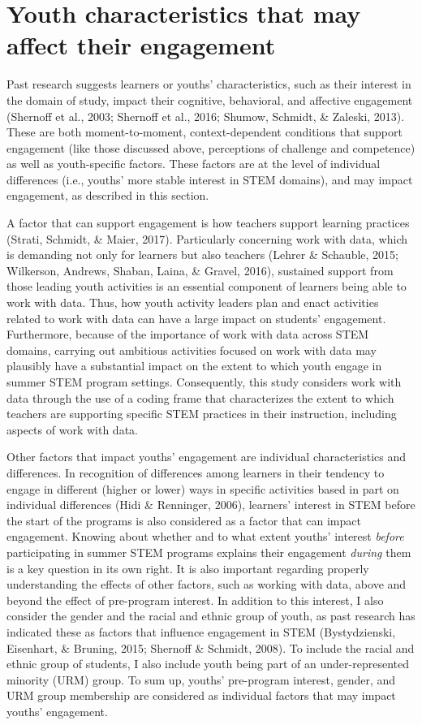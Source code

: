 \documentclass[]{msu-thesis}
\theoremstyle{definition}
\theoremstyle{definition}
\theoremstyle{definition}
\theoremstyle{remark}
\begin{document}
\section{Youth characteristics that may affect their
engagement}\label{youth-characteristics-that-may-affect-their-engagement}

Past research suggests learners or youths' characteristics, such as
their interest in the domain of study, impact their cognitive,
behavioral, and affective engagement (Shernoff et al., 2003; Shernoff et
al., 2016; Shumow, Schmidt, \& Zaleski, 2013). These are both
moment-to-moment, context-dependent conditions that support engagement
(like those discussed above, perceptions of challenge and competence) as
well as youth-specific factors. These factors are at the level of
individual differences (i.e., youths' more stable interest in STEM
domains), and may impact engagement, as described in this section.

A factor that can support engagement is how teachers support learning
practices (Strati, Schmidt, \& Maier, 2017). Particularly concerning
work with data, which is demanding not only for learners but also
teachers (Lehrer \& Schauble, 2015; Wilkerson, Andrews, Shaban, Laina,
\& Gravel, 2016), sustained support from those leading youth activities
is an essential component of learners being able to work with data.
Thus, how youth activity leaders plan and enact activities related to
work with data can have a large impact on students' engagement.
Furthermore, because of the importance of work with data across STEM
domains, carrying out ambitious activities focused on work with data may
plausibly have a substantial impact on the extent to which youth engage
in summer STEM program settings. Consequently, this study considers work
with data through the use of a coding frame that characterizes the
extent to which teachers are supporting specific STEM practices in their
instruction, including aspects of work with data.

Other factors that impact youths' engagement are individual
characteristics and differences. In recognition of differences among
learners in their tendency to engage in different (higher or lower) ways
in specific activities based in part on individual differences (Hidi \&
Renninger, 2006), learners' interest in STEM before the start of the
programs is also considered as a factor that can impact engagement.
Knowing about whether and to what extent youths' interest \emph{before}
participating in summer STEM programs explains their engagement
\emph{during} them is a key question in its own right. It is also
important regarding properly understanding the effects of other factors,
such as working with data, above and beyond the effect of pre-program
interest. In addition to this interest, I also consider the gender and
the racial and ethnic group of youth, as past research has indicated
these as factors that influence engagement in STEM (Bystydzienski,
Eisenhart, \& Bruning, 2015; Shernoff \& Schmidt, 2008). To include the
racial and ethnic group of students, I also include youth being part of
an under-represented minority (URM) group. To sum up, youths'
pre-program interest, gender, and URM group membership are considered as
individual factors that may impact youths' engagement.
\end{document}
